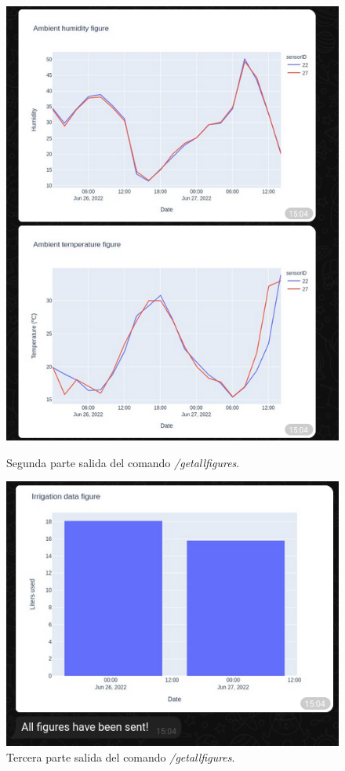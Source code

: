 \documentclass[a4paper, 12pt, oneside]{book}
\begin{document}
\begin{figure}[H]
\begin{minipage}[b]{0.4\textwidth}
    \includegraphics[width=\textwidth]{img/getallfiguresp2}
    \caption{Segunda parte salida del comando \textit{/getallfigures}.}
    \label{figura:getallfiguresp2}
  \end{minipage}
  \hfill
    \begin{minipage}[b]{0.4\textwidth}
    \includegraphics[width=\textwidth]{img/getallfiguresp3}
    \caption{Tercera parte salida del comando \textit{/getallfigures}.}
    \label{figura:getallfiguresp3}
  \end{minipage}
\end{figure}
\end{document}
